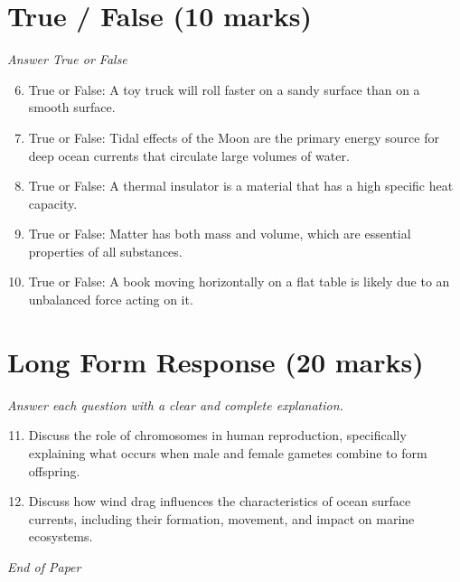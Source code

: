 \documentclass[12pt]{article}
\begin{document}
\section*{True / False (10 marks)}
\textit{Answer True or False}
\begin{enumerate}[label=\arabic*.]
\setcounter{enumi}{5}
\item True or False: A toy truck will roll faster on a sandy surface than on a smooth surface.
\item True or False: Tidal effects of the Moon are the primary energy source for deep ocean currents that circulate large volumes of water.
\item True or False: A thermal insulator is a material that has a high specific heat capacity.
\item True or False: Matter has both mass and volume, which are essential properties of all substances.
\item True or False: A book moving horizontally on a flat table is likely due to an unbalanced force acting on it.
\end{enumerate}

\section*{Long Form Response (20 marks)}
\textit{Answer each question with a clear and complete explanation.}
\begin{enumerate}[label=\arabic*.]
\setcounter{enumi}{10}
\item Discuss the role of chromosomes in human reproduction, specifically explaining what occurs when male and female gametes combine to form offspring.
\item Discuss how wind drag influences the characteristics of ocean surface currents, including their formation, movement, and impact on marine ecosystems.
\end{enumerate}

\vfill
\noindent\textit{End of Paper}
\end{document}
